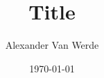 \documentclass[a4paper]{article}
\title{Title}
\author{Alexander Van Werde }
\date{\today}
\begin{document}
\maketitle

\lipsum




\end{document}
